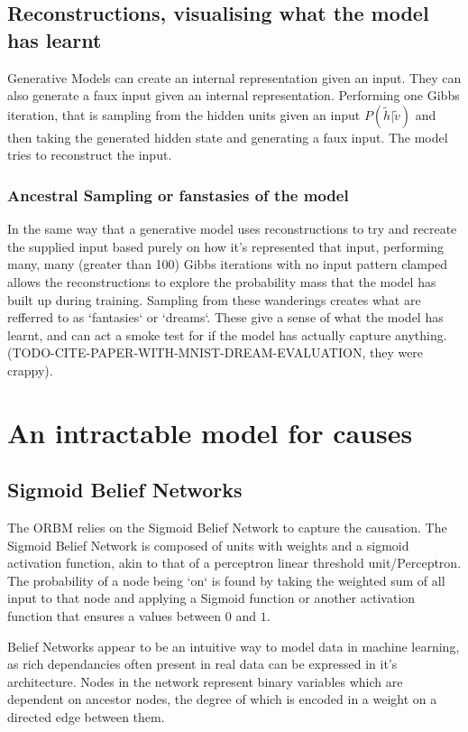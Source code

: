   \subsection{Reconstructions, visualising what the model has learnt}

  Generative Models can create an internal representation given an input. They can also generate a faux input given an internal representation. Performing one Gibbs iteration, that is sampling from the hidden units given an input $ P(\tilde{h}|\tilde{v}) $ and then taking the generated hidden state and generating a faux input. The model tries to reconstruct the input.

  \subsubsection{Ancestral Sampling or fanstasies of the model}
  \todo%
  In the same way that a generative model uses reconstructions to try and recreate the  supplied input based purely on how it's represented that input, performing many, many (greater than 100) Gibbs iterations with no input pattern clamped allows the reconstructions to explore the probability mass that the model has built up during training. Sampling from these wanderings creates what are refferred to as `fantasies` or `dreams`. These give a sense of what the model has learnt, and can act a smoke test for if the model has actually capture anything.
  (TODO-CITE-PAPER-WITH-MNIST-DREAM-EVALUATION, they were crappy).

  \section{An intractable model for causes}
    \subsection{Sigmoid Belief Networks}
    \todo%

    The ORBM relies on the Sigmoid Belief Network to capture the causation. The Sigmoid Belief Network is composed of units with weights and a sigmoid activation function, akin to that of a perceptron linear threshold unit/Perceptron. The probability of a node being `on` is found by taking the weighted sum of all input to that node and applying a Sigmoid function or another activation function that ensures a values between $0$ and $1$.

    Belief Networks appear to be an intuitive way to model data in machine learning, as rich dependancies often present in real data can be expressed in it's architecture. Nodes in the network represent binary variables which are dependent on ancestor nodes, the degree of which is encoded in a weight on a directed edge between them.

